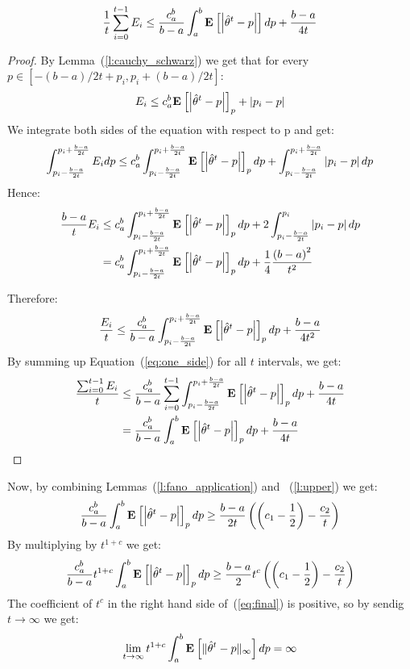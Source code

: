 \begin{lemma}\label{l:upper}
$$
\frac{1}{t} \sum_{i=0}^{t-1} E_i \leq \frac{c_a^b}{b-a} \int_a^b \Exp{\lp|\hat{\theta}^t-p\rp|} dp + \frac{b-a}{4t}
$$
\end{lemma}
\begin{proof}
By Lemma~(\ref{l:cauchy_schwarz}) we get that for every $p\in [-(b-a)/{2t} + p_i , p_i + (b-a)/{2t}]$:
$$E_i \leq  c_a^b\Exp{\lp|\hat{\theta}^t-p\rp|}_p + \lp|p_i - p\rp|$$
We integrate both sides of the equation with respect to p and get:
$$
\int_{p_i - \frac{b-a}{2t}}^{p_i + \frac{b-a}{2t}} E_i dp \leq c_a^b \int_{p_i - \frac{b-a}{2t}}^{p_i + \frac{b-a}{2t}}\Exp{\lp|\hat{\theta}^t-p\rp|}_p dp + \int_{p_i - \frac{b-a}{2t}}^{p_i + \frac{b-a}{2t}}\lp|p_i - p\rp| dp
$$
Hence:
\begin{align*}
\frac{b-a}{t} E_i &\leq c_a^b\int_{p_i - \frac{b-a}{2t}}^{p_i+ \frac{b-a}{2t}}\Exp{\lp|\hat{\theta}^t-p\rp|}_p dp +  2\int_{p_i - \frac{b-a}{2t}}^{p_i}\lp|p_i-p\rp|dp\\
&= c_a^b\int_{p_i - \frac{b-a}{2t}}^{p_i + \frac{b-a}{2t}}\Exp{\lp|\hat{\theta}^t-p\rp|}_p dp + \frac{1}{4} \frac{\lp(b-a\rp)^2}{t^2}
\end{align*}

Therefore:
\begin{equation}\label{eq:one_side}
\frac{E_i}{t} \leq \frac{c_a^b}{b-a} \int_{p_i - \frac{b-a}{2t}}^{p_i + \frac{b-a}{2t}}\Exp{\lp|\hat{\theta}^t-p\rp|}_p dp + \frac{b-a}{4t^2}
\end{equation}
By summing up Equation~(\ref{eq:one_side}) for all $t$ intervals, we get:
\begin{align*}
\frac{\sum_{i=0}^{t-1} E_i}{t} &\leq \frac{c_a^b}{b-a} \sum_{i=0}^{t-1}
\int_{p_i - \frac{b-a}{2t}}^{p_i+ \frac{b-a}{2t}}\Exp{\lp|\hat{\theta}^t-p\rp|}_p dp + \frac{b-a}{4t}\\
&=  \frac{c_a^b}{b-a} \int_a^b \Exp{\lp|\hat{\theta}^t-p\rp|}_p dp + \frac{b-a}{4t}
\end{align*}



\end{proof}
Now, by combining Lemmas~(\ref{l:fano_application}) and ~(\ref{l:upper}) we get:
$$
\frac{c_a^b}{b-a} \int_a^b \Exp{\lp|\hat{\theta}^t-p\rp|}_p dp \geq \frac{b-a}{2t}\lp(\lp(c_1 - \frac{1}{2}\rp)- \frac{c_2}{t}\rp)
$$
By multiplying by $t^{1+c}$ we get:
\begin{equation}\label{eq:final}
\frac{c_a^b}{b-a}t^{1+c} \int_a^b \Exp{\lp|\hat{\theta}^t-p\rp|}_p dp \geq \frac{b-a}{2}t^c\lp(\lp(c_1 - \frac{1}{2}\rp)- \frac{c_2}{t}\rp)
\end{equation}
The coefficient of $t^c$ in the right hand side of~(\ref{eq:final}) is positive, so by sendig $t \to \infty$ we get:
$$ \lim_{t\to\infty} t^{1+c}\int_{a}^b \Exp{\norm{\infty}{\hat{\theta}^t-p}}dp = \infty$$ 


